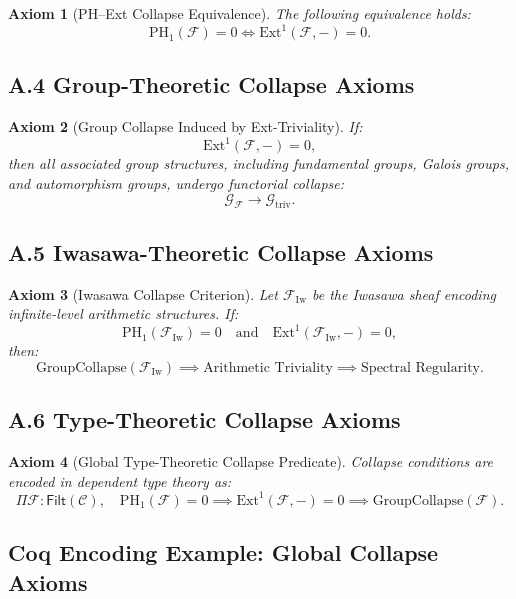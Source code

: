 \documentclass[11pt]{article}
\newtheorem{axiom}{Axiom}[section]
\begin{document}
\begin{axiom}[PH–Ext Collapse Equivalence]
The following equivalence holds:
\[
\mathrm{PH}_1(\mathcal{F}) = 0 \iff \mathrm{Ext}^1(\mathcal{F}, -) = 0.
\]
\end{axiom}

\subsection*{A.4 Group-Theoretic Collapse Axioms}

\begin{axiom}[Group Collapse Induced by Ext-Triviality]
If:
\[
\mathrm{Ext}^1(\mathcal{F}, -) = 0,
\]
then all associated group structures, including fundamental groups, Galois groups, and automorphism groups, undergo functorial collapse:
\[
\mathcal{G}_{\mathcal{F}} \longrightarrow \mathcal{G}_{\mathrm{triv}}.
\]
\end{axiom}

\subsection*{A.5 Iwasawa-Theoretic Collapse Axioms}

\begin{axiom}[Iwasawa Collapse Criterion]
Let $\mathcal{F}_{\mathrm{Iw}}$ be the Iwasawa sheaf encoding infinite-level arithmetic structures. If:
\[
\mathrm{PH}_1(\mathcal{F}_{\mathrm{Iw}}) = 0 \quad \text{and} \quad \mathrm{Ext}^1(\mathcal{F}_{\mathrm{Iw}}, -) = 0,
\]
then:
\[
\mathrm{GroupCollapse}(\mathcal{F}_{\mathrm{Iw}}) \implies \text{Arithmetic Triviality} \implies \text{Spectral Regularity}.
\]
\end{axiom}

\subsection*{A.6 Type-Theoretic Collapse Axioms}

\begin{axiom}[Global Type-Theoretic Collapse Predicate]
Collapse conditions are encoded in dependent type theory as:
\[
\Pi \mathcal{F} : \mathsf{Filt}(\mathcal{C}), \quad 
\mathrm{PH}_1(\mathcal{F}) = 0 \implies 
\mathrm{Ext}^1(\mathcal{F}, -) = 0 \implies 
\mathrm{GroupCollapse}(\mathcal{F}).
\]
\end{axiom}

\subsection*{Coq Encoding Example: Global Collapse Axioms}
\end{document}
